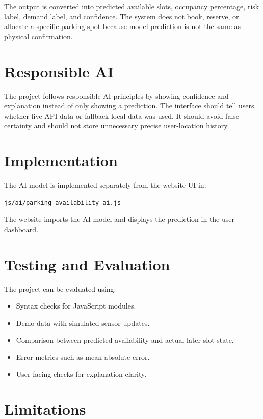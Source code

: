 \documentclass[12pt,a4paper]{article}
\begin{document}
The output is converted into predicted available slots, occupancy percentage, risk label, demand label, and confidence. The system does not book, reserve, or allocate a specific parking spot because model prediction is not the same as physical confirmation.

\section{Responsible AI}
\label{sec:responsible-ai}

The project follows responsible AI principles by showing confidence and explanation instead of only showing a prediction. The interface should tell users whether live API data or fallback local data was used. It should avoid false certainty and should not store unnecessary precise user-location history.

\section{Implementation}
\label{sec:implementation}

The AI model is implemented separately from the website UI in:

\begin{lstlisting}
js/ai/parking-availability-ai.js
\end{lstlisting}

The website imports the AI model and displays the prediction in the user dashboard.

\section{Testing and Evaluation}
\label{sec:testing}

The project can be evaluated using:

\begin{itemize}
  \item Syntax checks for JavaScript modules.
  \item Demo data with simulated sensor updates.
  \item Comparison between predicted availability and actual later slot state.
  \item Error metrics such as mean absolute error.
  \item User-facing checks for explanation clarity.
\end{itemize}

\section{Limitations}
\label{sec:limitations}
\end{document}

